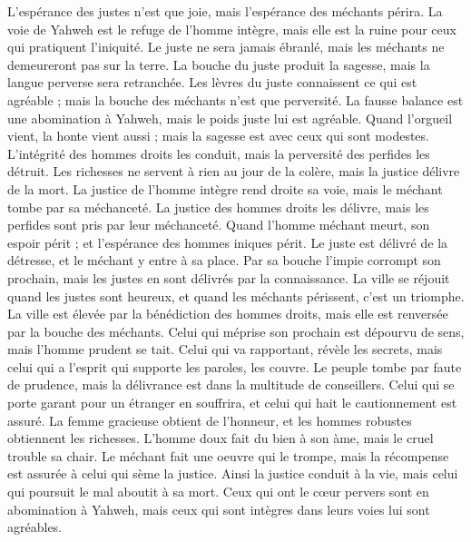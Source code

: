 \begin{multicols}{2}
L'espérance des justes n'est que joie, mais l'espérance des méchants périra.
La voie de Yahweh est le refuge de l'homme intègre, mais elle est la ruine pour ceux qui pratiquent l'iniquité.
Le juste ne sera jamais ébranlé, mais les méchants ne demeureront pas sur la terre.
La bouche du juste produit la sagesse, mais la langue perverse sera retranchée.
Les lèvres du juste connaissent ce qui est agréable ; mais la bouche des méchants n'est que perversité.
\VerseOne{}La fausse balance est une abomination à Yahweh, mais le poids juste lui est agréable.
Quand l'orgueil vient, la honte vient aussi ; mais la sagesse est avec ceux qui sont modestes.
L'intégrité des hommes droits les conduit, mais la perversité des perfides les détruit.
Les richesses ne servent à rien au jour de la colère, mais la justice délivre de la mort.
La justice de l'homme intègre rend droite sa voie, mais le méchant tombe par sa méchanceté.
La justice des hommes droits les délivre, mais les perfides sont pris par leur méchanceté.
Quand l'homme méchant meurt, son espoir périt ; et l'espérance des hommes iniques périt.
Le juste est délivré de la détresse, et le méchant y entre à sa place.
Par sa bouche l'impie corrompt son prochain, mais les justes en sont délivrés par la connaissance.
La ville se réjouit quand les justes sont heureux, et quand les méchants périssent, c'est un triomphe.
La ville est élevée par la bénédiction des hommes droits, mais elle est renversée par la bouche des méchants.
Celui qui méprise son prochain est dépourvu de sens, mais l'homme prudent se tait.
Celui qui va rapportant, révèle les secrets, mais celui qui a l'esprit qui supporte les paroles, les couvre.
Le peuple tombe par faute de prudence, mais la délivrance est dans la multitude de conseillers.
Celui qui se porte garant pour un étranger en souffrira, et celui qui hait le cautionnement est assuré.
La femme gracieuse obtient de l'honneur, et les hommes robustes obtiennent les richesses.
L'homme doux fait du bien à son àme, mais le cruel trouble sa chair.
Le méchant fait une oeuvre qui le trompe, mais la récompense est assurée à celui qui sème la justice.
Ainsi la justice conduit à la vie, mais celui qui poursuit le mal aboutit à sa mort.
Ceux qui ont le cœur pervers sont en abomination à Yahweh, mais ceux qui sont intègres dans leurs voies lui sont agréables.

\end{multicols}
